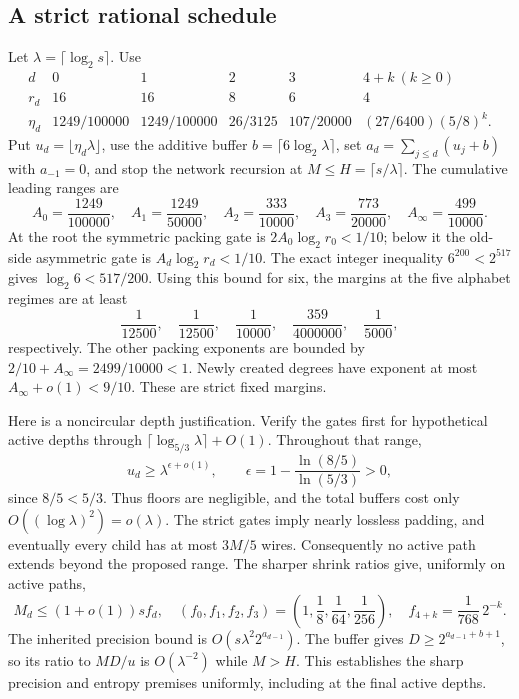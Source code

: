 \subsection{A strict rational schedule}

Let $\lambda=\lceil\log_2s\rceil$. Use
\begin{equation}\label{eq:quartet-schedule}
\begin{array}{c|ccccc}
 d&0&1&2&3&4+k\ (k\ge0)\\\hline
 r_d&16&16&8&6&4\\
 \eta_d&1249/100000&1249/100000&26/3125&107/20000&(27/6400)(5/8)^k.
\end{array}
\end{equation}
Put $u_d=\lfloor\eta_d\lambda\rfloor$, use the additive buffer
$b=\lceil6\log_2\lambda\rceil$, set
$a_d=\sum_{j\le d}(u_j+b)$ with $a_{-1}=0$, and stop the network recursion at
$M\le H=\lceil s/\lambda\rceil$. The cumulative leading ranges are
\[
 A_0=\frac{1249}{100000},\quad A_1=\frac{1249}{50000},\quad
 A_2=\frac{333}{10000},\quad A_3=\frac{773}{20000},\quad
 A_\infty=\frac{499}{10000}.
\]
At the root the symmetric packing gate is
$2A_0\log_2r_0<1/10$; below it the old-side asymmetric gate is
$A_d\log_2r_d<1/10$. The exact integer inequality
$6^{200}<2^{517}$ gives $\log_2 6<517/200$. Using this bound for six,
the margins at the five alphabet regimes are at least
\[
 \frac1{12500},\quad\frac1{12500},\quad\frac1{10000},\quad
 \frac{359}{4000000},\quad\frac1{5000},
\]
respectively. The other packing exponents are bounded by
$2/10+A_\infty=2499/10000<1$. Newly created degrees have exponent
at most $A_\infty+o(1)<9/10$. These are strict fixed margins.

Here is a noncircular depth justification. Verify the gates first for
hypothetical active depths through
$\lceil\log_{5/3}\lambda\rceil+O(1)$. Throughout that range,
\[
 u_d\ge\lambda^{\epsilon+o(1)},\qquad
 \epsilon=1-\frac{\ln(8/5)}{\ln(5/3)}>0,
\]
since $8/5<5/3$. Thus floors are negligible, and the total buffers cost
only $O((\log\lambda)^2)=o(\lambda)$. The strict gates imply nearly
lossless padding, and eventually every child has at most $3M/5$ wires.
Consequently no active path extends beyond the proposed range. The
sharper shrink ratios give, uniformly on active paths,
\[
 M_d\le(1+o(1))s f_d,
 \quad(f_0,f_1,f_2,f_3)=\left(1,\frac18,\frac1{64},\frac1{256}\right),
 \quad f_{4+k}=\frac1{768}\,2^{-k}.
\]
The inherited precision bound is $O(s\lambda^2 2^{a_{d-1}})$.
The buffer gives $D\ge2^{a_{d-1}+b+1}$, so its ratio to $MD/u$ is
$O(\lambda^{-2})$ while $M>H$. This establishes the sharp precision
and entropy premises uniformly, including at the final active depths.

